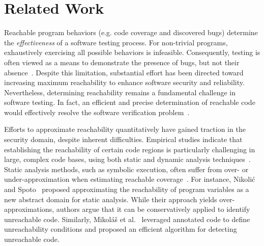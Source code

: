 \documentclass[conference]{IEEEtran}
\begin{document}
\section{Related Work}
\label{sec:related}

Reachable program behaviors (e.g. code coverage and discovered bugs) determine the \emph{effectiveness} of a software testing process. For non-trivial programs, exhaustively exercising all possible behaviors is infeasible. Consequently, testing is often viewed as a means to demonstrate the presence of bugs, but not their absence~\cite{dijkstra2022reliability}. Despite this limitation, substantial effort has been directed toward increasing maximum reachability to enhance software security and reliability. Nevertheless, determining reachability remains a fundamental challenge in software testing. In fact, an efficient and precise determination of reachable code would effectively resolve the software verification problem~\cite{liyanage2023reachable}. 

Efforts to approximate reachability quantitatively have gained traction in the security domain, despite inherent difficulties. Empirical studies indicate that establishing the reachability of certain code regions is particularly challenging in large, complex code bases, using both static and dynamic analysis techniques~\cite{latoza2010developers}. Static analysis methods, such as symbolic execution, often suffer from over- or under-approximation when estimating reachable coverage~\cite{liyanage2023reachable,aniche2015why}. For instance, Nikoli\'{c} and Spoto~\cite{nikolic2013reachability} proposed approximating the reachability of program variables as a new abstract domain for static analysis. While their approach yields over-approximations, authors argue that it can be conservatively applied to identify unreachable code. Similarly, Mikol\'{a}\v{s} et al.~\cite{janota2007reachability} leveraged annotated code to define unreachability conditions and proposed an efficient algorithm for detecting unreachable code.
\end{document}
